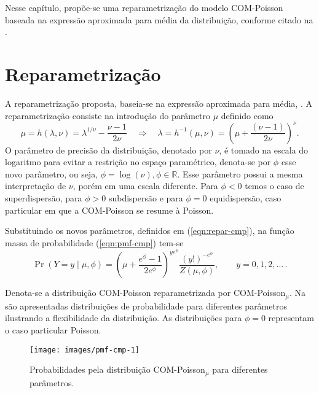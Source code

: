 \documentclass[
    oldfontcommands,
    11pt,
    openright,
    twoside,
    a4paper,
    english,
    brazil
]{abntex2}\usepackage[]{graphicx}\usepackage[]{color}
\begin{document}
Nesse capítulo, propõe-se uma reparametrização do modelo COM-Poisson
baseada na expressão aproximada para média da distribuição, conforme
citado na .

\section{Reparametrização}

A reparametrização proposta, baseia-se na expressão aproximada para
média, . A reparametrização consiste na introdução
do parâmetro $\mu$ definido como
\begin{equation}
  \label{eqn:repar-cmp}
  \mu = h(\lambda, \nu) = \lambda^{1/\nu} - \frac{\nu - 1}{2\nu}
  \quad \Rightarrow \quad
  \lambda = h^{-1}(\mu, \nu) = \left (\mu +
    \frac{(\nu - 1)}{2\nu} \right )^\nu.
\end{equation}
O parâmetro de precisão da distribuição, denotado por $\nu$, é tomado na
escala do logaritmo para evitar a restrição no espaço paramétrico,
denota-se por $\phi$ esse novo parâmetro, ou seja,
$\phi = \log(\nu), \phi \in \mathbb{R}$. Esse parâmetro possui a mesma
interpretação de $\nu$, porém em uma escala diferente. Para $\phi < 0$
temos o caso de superdispersão, para $\phi > 0$ subdispersão e para
$\phi=0$ equidispersão, caso particular em que a COM-Poisson se resume à
Poisson.

Substituindo os novos parâmetros, definidos em (\ref{eqn:repar-cmp}), na
função massa de probabilidade (\ref{eqn:pmf-cmp}) tem-se
\begin{equation}
  \label{eqn:pmf-cmpmu}
  \Pr(Y=y \mid \mu, \phi) =
  \left ( \mu +\frac{ e^\phi-1}{2e^\phi} \right )^{ye^\phi}
  \frac{(y!)^{-e^\phi}}{Z(\mu, \phi)},
  \qquad y = 0, 1, 2, \ldots\, .
\end{equation}

Denota-se a distribuição COM-Poisson reparametrizada por
COM-Poisson$_\mu$. Na  são apresentadas
distribuições de probabilidade para diferentes parâmetros ilustrando a
flexibilidade da distribuição. As distribuições para $\phi=0$
representam o caso particular Poisson.

\begin{figure}[!htb]

{\centering \texttt{[image: images/pmf-cmp-1]} 

}

\caption[Probabilidades pela distribuição COM-Poisson$_\mu$ para diferentes parâmetros]{Probabilidades pela distribuição COM-Poisson$_\mu$ para diferentes parâmetros.}\label{fig:pmf-cmp}
\end{figure}
\end{document}

